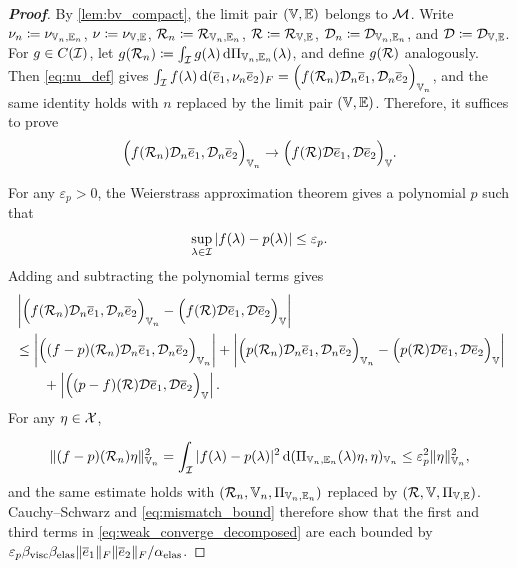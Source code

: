 \begin{proof}[\bf Proof]
By \cref{lem:bv_compact}, the limit pair $(\mathbb{V},\mathbb{E})$ belongs to ${\mathcal{M}}$. Write $\nu_n\coloneqq \nu_{\mathbb{V}_n,\mathbb{E}_n}$, $\nu\coloneqq \nu_{\mathbb{V},\mathbb{E}}$, ${\mathcal{R}}_n\coloneqq {\mathcal{R}}_{\mathbb{V}_n,\mathbb{E}_n}$, ${\mathcal{R}}\coloneqq {\mathcal{R}}_{\mathbb{V},\mathbb{E}}$, ${\mathcal{D}}_n\coloneqq {\mathcal{D}}_{\mathbb{V}_n,\mathbb{E}_n}$, and ${\mathcal{D}}\coloneqq {\mathcal{D}}_{\mathbb{V},\mathbb{E}}$. For $g\in C({\mathcal{I}})$, let $g({\mathcal{R}}_n)\coloneqq \int_{{\mathcal{I}}} g(\lambda)\,\mathrm{d}\Pi_{\mathbb{V}_n,\mathbb{E}_n}(\lambda)$, and define $g({\mathcal{R}})$ analogously. Then \cref{eq:nu_def} gives $\int_{{\mathcal{I}}} f(\lambda)\,\mathrm{d}(\overline e_1,\nu_n\overline e_2)_F
=\Bigl(f({\mathcal{R}}_n){\mathcal{D}}_n\overline e_1,{\mathcal{D}}_n\overline e_2\Bigr)_{\mathbb{V}_n}$,
and the same identity holds with $n$ replaced by the limit pair $(\mathbb{V},\mathbb{E})$. Therefore, it suffices to prove
\begin{equation}\label{eq:weak_converge_g}
    \Bigl(f({\mathcal{R}}_n){\mathcal{D}}_n\overline e_1,{\mathcal{D}}_n\overline e_2\Bigr)_{\mathbb{V}_n}\to \Bigl(f({\mathcal{R}}){\mathcal{D}}\overline e_1,{\mathcal{D}}\overline e_2\Bigr)_{\mathbb{V}}.
\end{equation}

{For any $\varepsilon_p>0$, the Weierstrass approximation theorem gives a polynomial $p$ such that
\begin{equation*}
\sup_{\lambda\in{\mathcal{I}}}|f(\lambda)-p(\lambda)|\le\varepsilon_p.
\end{equation*}
}
Adding and subtracting the polynomial terms gives
\begin{align}
&\left|\Bigl(f({\mathcal{R}}_n){\mathcal{D}}_n\overline e_1,{\mathcal{D}}_n\overline e_2\Bigr)_{\mathbb{V}_n}-\Bigl(f({\mathcal{R}}){\mathcal{D}}\overline e_1,{\mathcal{D}}\overline e_2\Bigr)_{\mathbb{V}}\right|\nonumber\\
&\le \left|\Bigl((f-p)({\mathcal{R}}_n){\mathcal{D}}_n\overline e_1,{\mathcal{D}}_n\overline e_2\Bigr)_{\mathbb{V}_n}\right|
+\left|\Bigl(p({\mathcal{R}}_n){\mathcal{D}}_n\overline e_1,{\mathcal{D}}_n\overline e_2\Bigr)_{\mathbb{V}_n}-\Bigl(p({\mathcal{R}}){\mathcal{D}}\overline e_1,{\mathcal{D}}\overline e_2\Bigr)_{\mathbb{V}}\right|\nonumber\\
&\qquad +\left|\Bigl((p-f)({\mathcal{R}}){\mathcal{D}}\overline e_1,{\mathcal{D}}\overline e_2\Bigr)_{\mathbb{V}}\right|.\label{eq:weak_converge_decomposed}
\end{align}
For any $\eta\in{\mathcal{X}}$,

\begin{equation*}
    \|(f-p)({\mathcal{R}}_n)\eta\|_{\mathbb{V}_n}^2
=\int_{{\mathcal{I}}}|f(\lambda)-p(\lambda)|^2\,\mathrm{d}(\Pi_{\mathbb{V}_n,\mathbb{E}_n}(\lambda)\eta,\eta)_{\mathbb{V}_n}
\le \varepsilon_p^2\|\eta\|_{\mathbb{V}_n}^2,
\end{equation*}
and the same estimate holds with $({\mathcal{R}}_n,\mathbb{V}_n,\Pi_{\mathbb{V}_n,\mathbb{E}_n})$ replaced by $({\mathcal{R}},\mathbb{V},\Pi_{\mathbb{V},\mathbb{E}})$. {Cauchy--Schwarz and \cref{eq:mismatch_bound} therefore show} that the first and third terms in \cref{eq:weak_converge_decomposed} are each bounded by $\varepsilon_p\beta_{\rm visc}\beta_{\rm elas}\|\overline e_1\|_F\|\overline e_2\|_F/\alpha_{\rm elas}$.


\end{proof}
